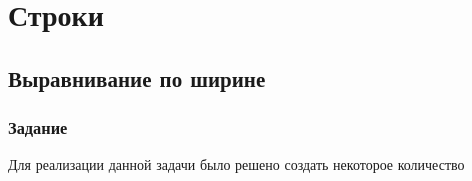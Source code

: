 \documentclass[12pt,a4paper]{report}
\begin{document}
%
\chapter{Строки}
\section{Выравнивание по ширине}
\subsection{Задание}
\hspace{\parindent}
Для реализации данной задачи было решено создать некоторое количество 
\end{document}
